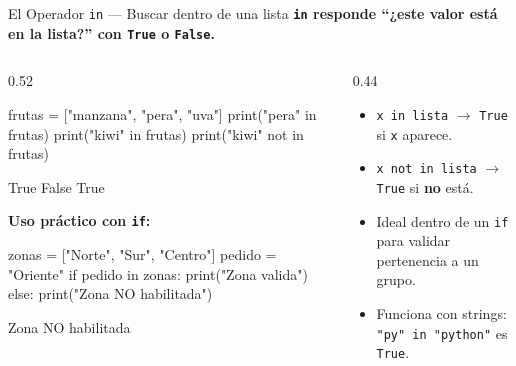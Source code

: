 \documentclass[aspectratio=169, 11pt]{beamer}
\begin{document}
\begin{frame}[fragile,shrink=35]{El Operador \texttt{in} --- Buscar dentro de una lista}
  \vspace{-6pt}
  {\small\color{arcaDark}\bfseries
    \texttt{in} responde ``¿este valor está en la lista?''
    con \texttt{True} o \texttt{False}.}

  \vspace{4pt}
  \begin{columns}[T]
    \begin{column}{0.52\textwidth}
      \begin{pyblock}
frutas = ["manzana", "pera", "uva"]
print("pera" in frutas)
print("kiwi" in frutas)
print("kiwi" not in frutas)
      \end{pyblock}
      \vspace{-2pt}
      \begin{outputblock}
True
False
True
      \end{outputblock}

      \vspace{3pt}
      {\footnotesize\color{arcaDark}\bfseries Uso práctico con \texttt{if}:}
      \vspace{2pt}
      \begin{pyblock}
zonas = ["Norte", "Sur", "Centro"]
pedido = "Oriente"
if pedido in zonas:
    print("Zona valida")
else:
    print("Zona NO habilitada")
      \end{pyblock}
      \vspace{-2pt}
      \begin{outputblock}
Zona NO habilitada
      \end{outputblock}
    \end{column}

    \begin{column}{0.44\textwidth}
      \vspace{2pt}
      {\footnotesize\color{textMuted}
      \begin{itemize}\setlength{\itemsep}{4pt}
        \item[{\color{arcaRed}\scriptsize\faArrowRight}]
          \texttt{x in lista} $\rightarrow$
          \texttt{True} si \texttt{x} aparece.
        \item[{\color{arcaRed}\scriptsize\faArrowRight}]
          \texttt{x not in lista} $\rightarrow$
          \texttt{True} si \textbf{no} está.
        \item[{\color{arcaRed}\scriptsize\faArrowRight}]
          Ideal dentro de un \texttt{if}
          para validar pertenencia a
          un grupo.
        \item[{\color{arcaRed}\scriptsize\faLightbulb}]
          Funciona con strings:
          \texttt{"py" in "python"} es
          \texttt{True}.
      \end{itemize}
      }
    \end{column}
  \end{columns}
\end{frame}
\end{document}
